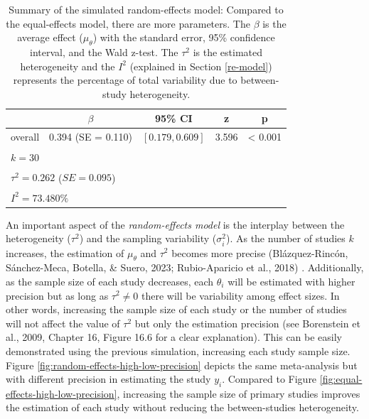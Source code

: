 \documentclass[
  man,floatsintext]{apa6}
\begin{document}
\scriptsize

\begin{table}[H]

\caption{\label{tab:res-random-effects}\color{red} Summary of the simulated random-effects model: Compared to the equal-effects model, there are more parameters. The \(\beta\) is the average effect (\(\mu_{\theta}\)) with the standard error, 95\% confidence interval, and the Wald z-test. The \(\tau^{2}\) is the estimated heterogeneity and the \(I^{2}\) (explained in Section \ref{re-model}) represents the percentage of total variability due to between-study heterogeneity. \color{black}}
\centering
\fontsize{9}{11}\selectfont
\begin{tabular}[t]{ccccc}
\toprule
 & $\beta$ & 95\% CI & z & p\\
\midrule
overall & 0.394 (SE = 0.110) & $[0.179, 0.609]$ & 3.596 & < 0.001\\
\bottomrule
\multicolumn{5}{l}{\textsuperscript{} $k = 30$}\\
\multicolumn{5}{l}{\textsuperscript{} $\tau^2 = 0.262$ ($SE = 0.095$)}\\
\multicolumn{5}{l}{\textsuperscript{} $I^2 = 73.480\%$}\\
\end{tabular}
\end{table}

\normalsize

An important aspect of the \emph{random-effects model} is the interplay between the heterogeneity (\(\tau^{2}\)) and the sampling variability (\(\sigma_{i}^{2}\)). As the number of studies \(k\) increases, the estimation of \(\mu_{\theta}\) and \(\tau^{2}\) becomes more precise \color{red} (Blázquez-Rincón, Sánchez-Meca, Botella, \& Suero, 2023; Rubio-Aparicio et al., 2018) \color{black}. Additionally, as the sample size of each study decreases, each \(\theta_{i}\) will be estimated with higher precision but as long as \(\tau^{2} \neq 0\) there will be variability among effect sizes. In other words, increasing the sample size of each study or the number of studies will not affect the value of \(\tau^{2}\) but only the estimation precision (see Borenstein et al., 2009, Chapter 16, Figure 16.6 for a clear explanation). This can be easily demonstrated using the previous simulation, increasing each study sample size. Figure \ref{fig:random-effects-high-low-precision} depicts the same meta-analysis but with different precision in estimating the study \(y_{i}\). Compared to Figure \ref{fig:equal-effects-high-low-precision}, increasing the sample size of primary studies improves the estimation of each study without reducing the between-studies heterogeneity.
\end{document}
